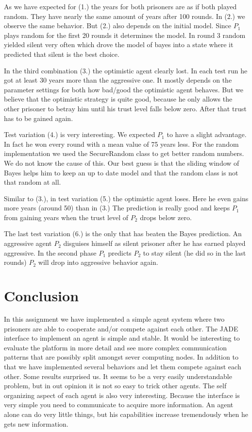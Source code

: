 \documentclass{acm_proc_article-sp}
\begin{document}
As we have expected for (1.) the years for both prisoners are as if both played random. They
have nearly the same amount of years after 100 rounds. In (2.) we observe the same behavior. But (2.) also depends on the initial model. Since $P_1$ plays random for the first 20 rounds
it determines the model. In round 3 random yielded silent very often which drove the model
of bayes into a state where it predicted that silent is the best choice.

In the third combination (3.) the optimistic agent clearly lost. In each test run he got at least 30 years more than the aggressive one. It mostly depends on the parameter settings for both how bad/good the optimistic agent behaves. But we believe that the optimistic strategy is
quite good, because he only allows the other prisoner to betray him until his trust level falls below zero. After that trust has to be gained again.

Test variation (4.) is very interesting. We expected $P_1$ to have a slight advantage. In fact
he won every round with a mean value of 75 years less. For the
random implementation we used the SecureRandom class to get better random numbers. We
do not know the cause of this. Our best guess is that the sliding window of Bayes helps
him to keep an up to date model and that the random class is not that random at all.

Similar to (3.), in test variation (5.) the optimistic agent loses. 
Here he even gains more years (around 50) than in (3.)
The prediction is really good and keeps $P_1$ from gaining years
when the trust level of $P_2$ drops below zero.

The last test variation (6.) is the only that has beaten the Bayes prediction. An aggressive
agent $P_2$ disguises himself as silent prisoner after he has earned played aggressive.
In the second phase $P_1$ predicts $P_2$ to stay silent (he did so in the last rounds) 
$P_2$ will drop into aggressive behavior again.

\section{Conclusion}

In this assignment we have implemented a simple agent system where two prisoners are able to
cooperate and/or compete against each other. The JADE interface to implement an agent
is simple and stable. It would be interesting to evaluate the platform in more detail
and see more complex communication patterns that are possibly split amongst sever computing nodes.
In addition to that we have implemented several behaviors and let them compete against each other. Some results surprised us. It seems to be a very easily understandable problem, but
in out opinion it is not so easy to trick other agents.
The self organizing aspect of each agent is also very interesting. Because the interface
is very simple you need to communicate to acquire more information. An agent alone can do
very little things, but his capabilities increase tremendously when he gets new information.



\end{document}
